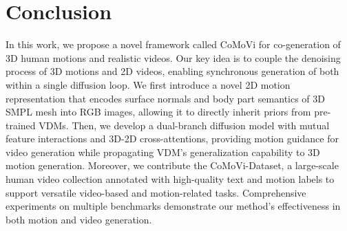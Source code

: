 \section{Conclusion}
\label{sec:conclusion}
In this work, we propose a novel framework called CoMoVi for co-generation of 3D human motions and realistic videos. Our key idea is to couple the denoising process of 3D motions and 2D videos, enabling synchronous generation of both within a single diffusion loop. We first introduce a novel 2D motion representation that encodes surface normals and body part semantics of 3D SMPL mesh into RGB images, allowing it to directly inherit priors from pre-trained VDMs. Then, we develop a dual-branch diffusion model with mutual feature interactions and 3D-2D cross-attentions, providing motion guidance for video generation while propagating VDM's generalization capability to 3D motion generation. Moreover, we contribute the CoMoVi-Dataset, a large-scale human video collection annotated with high-quality text and motion labels to support versatile video-based and motion-related tasks. Comprehensive experiments on multiple benchmarks demonstrate our method's effectiveness in both motion and video generation.